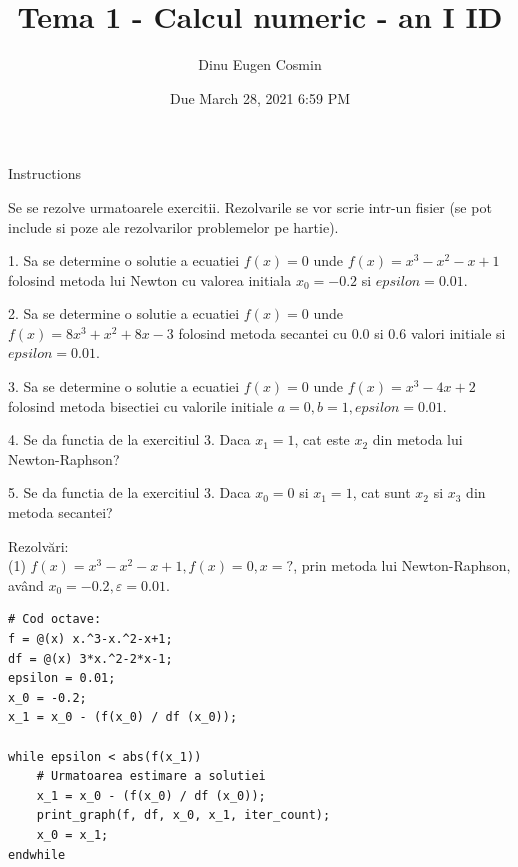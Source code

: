 \documentclass[12pt]{article}
\title{Tema 1 - Calcul numeric - an I ID}
\date{Due March 28, 2021 6:59 PM}
\author{Dinu Eugen Cosmin}
\begin{document}
\maketitle
\thispagestyle{empty}

\begin{sloppypar}
Instructions

Se se rezolve urmatoarele exercitii. Rezolvarile se vor scrie intr-un fisier (se pot include si poze ale rezolvarilor problemelor pe hartie).

1. Sa se determine o solutie a ecuatiei $f(x)=0$ unde $f(x)=x^3-x^2-x+1$  folosind metoda lui Newton cu valorea initiala $x_0=-0.2$ si $epsilon=0.01$.

2. Sa se determine o solutie a ecuatiei $f(x)=0$ unde $f(x)=8x^3+x^2+8x-3$ folosind metoda secantei cu $0.0$ si $0.6$ valori initiale si $epsilon=0.01$.

3. Sa se determine o solutie a ecuatiei $f(x)=0$ unde $f(x)=x^3-4x+2$ folosind metoda bisectiei cu valorile initiale $a=0, b=1, epsilon=0.01$.

4. Se da functia de la exercitiul 3. Daca $x_1=1$, cat este $x_2$ din metoda lui Newton-Raphson?

5. Se da functia de la exercitiul 3. Daca $x_0=0$ si $x_1=1$, cat sunt $x_2$ si $x_3$ din metoda secantei?
\end{sloppypar}
\pagebreak

Rezolvări:\\

(1) $f(x)=x^3-x^2-x+1, f(x)=0, x=?$, prin metoda lui Newton-Raphson,
având $x_0=-0.2, \varepsilon=0.01$.
\begin{multicols}{2}
\scriptsize
\begin{verbatim}
# Cod octave:
f = @(x) x.^3-x.^2-x+1;
df = @(x) 3*x.^2-2*x-1;
epsilon = 0.01;
x_0 = -0.2;
x_1 = x_0 - (f(x_0) / df (x_0));

while epsilon < abs(f(x_1))
    # Urmatoarea estimare a solutiei
    x_1 = x_0 - (f(x_0) / df (x_0));
    print_graph(f, df, x_0, x_1, iter_count);
    x_0 = x_1;
endwhile
\end{verbatim}
\end{multicols}
\end{document}
